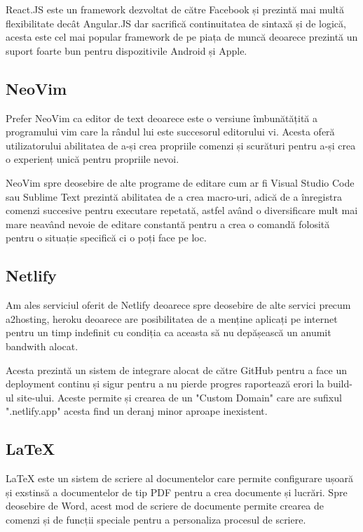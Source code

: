 \documentclass{article}
\begin{document}
    React.JS este un framework dezvoltat de către Facebook și prezintă mai multă flexibilitate decât Angular.JS dar sacrifică continuitatea de sintaxă și de logică, acesta este cel mai popular framework de pe piața de muncă deoarece prezintă un suport foarte bun pentru dispozitivile Android și Apple.

    \subsection{NeoVim}

    Prefer NeoVim ca editor de text deoarece este o versiune îmbunătățită a programului vim care la rândul lui este succesorul editorului vi. Acesta oferă utilizatorului abilitatea de a-și crea propriile comenzi și scurături pentru a-și crea o experienț unică pentru propriile nevoi.

    NeoVim spre deosebire de alte programe de editare cum ar fi Visual Studio Code sau Sublime Text prezintă abilitatea de a crea macro-uri, adică de a înregistra comenzi succesive pentru executare repetată, astfel având o diversificare mult mai mare neavând nevoie de editare constantă pentru a crea o comandă folosită pentru o situație specifică ci o poți face pe loc.

    \subsection{Netlify}

    Am ales serviciul oferit de Netlify deoarece spre deosebire de alte servici precum a2hosting, heroku deoarece are posibilitatea de a menține aplicați pe internet pentru un timp indefinit cu condiția ca aceasta să nu depășească un anumit bandwith alocat.

    Acesta prezintă un sistem de integrare alocat de către GitHub pentru a face un deployment continu și sigur pentru a nu pierde progres raportează erori la build-ul site-ului. Aceste permite și crearea de un "Custom Domain" care are sufixul ".netlify.app" acesta find un deranj minor aproape inexistent.

    \subsection{{\LaTeX}}

    {\LaTeX}  este un sistem de scriere al documentelor care permite configurare ușoară și exstinsă a documentelor de tip PDF pentru a crea documente și lucrări. Spre deosebire de Word, acest mod de scriere de documente permite crearea de comenzi și de funcții speciale pentru a personaliza procesul de scriere.
\end{document}
